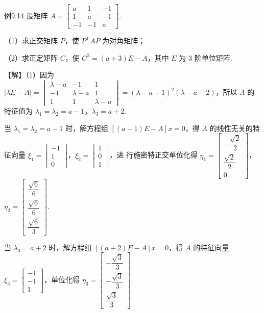 \begin{fcard}{例9.14}
设矩阵 $A=\begin{bmatrix}a&1&-1\\1&a&-1\\-1&-1&a\end{bmatrix}$.

（1）求正交矩阵 $P$，使 $P^{\mathrm{T}}AP$ 为对角矩阵；

（2）求正定矩阵 $C$，使 $C^2=(a+3)E-A$，其中 $E$ 为 3 阶单位矩阵.

【解】（1）因为 $|\lambda E-A|=\begin{vmatrix}\lambda-a&-1&1\\-1&\lambda-a&1\\1&1&\lambda-a\end{vmatrix}=(\lambda-a+1)^2(\lambda-a-2)$，所以 $A$ 的特征值为 $\lambda_1=\lambda_2=a-1$，$\lambda_3=a+2$.

当 $\lambda_1=\lambda_2=a-1$ 时，解方程组 $[(a-1)E-A]x=0$，得 $A$ 的线性无关的特征向量 $\xi_1=\begin{bmatrix}-1\\1\\0\end{bmatrix}$，$\xi_2=\begin{bmatrix}1\\0\\1\end{bmatrix}$，进
行施密特正交单位化得 $\eta_1=\begin{bmatrix}-\dfrac{\sqrt{2}}{2}\\[2mm]\dfrac{\sqrt{2}}{2}\\[1mm]0\end{bmatrix}$，$\eta_2=\begin{bmatrix}\dfrac{\sqrt{6}}{6}\\[2mm]\dfrac{\sqrt{6}}{6}\\[2mm]\dfrac{\sqrt{6}}{3}\end{bmatrix}$.

当 $\lambda_3=a+2$ 时，解方程组 $[(a+2)E-A]x=0$，得 $A$ 的特征向量 $\xi_3=\begin{bmatrix}-1\\-1\\1\end{bmatrix}$，单位化得 $\eta_3=\begin{bmatrix}-\dfrac{\sqrt{3}}{3}\\[2mm]-\dfrac{\sqrt{3}}{3}\\[2mm]\dfrac{\sqrt{3}}{3}\end{bmatrix}$.


\end{fcard}
